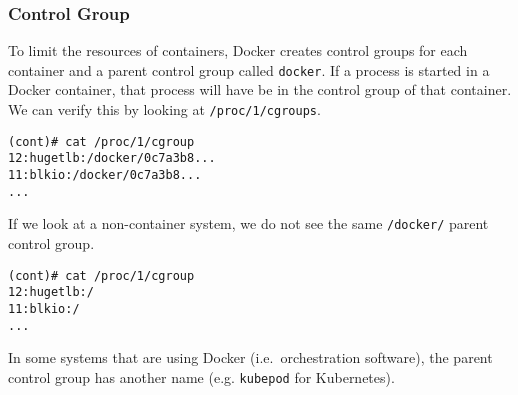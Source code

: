 \subsubsection{Control Group}
To limit the resources of containers, Docker creates control groups for each container and a parent control group called \lstinline{docker}. If a process is started in a Docker container, that process will have be in the control group of that container. We can verify this by looking at \lstinline{/proc/1/cgroups}\cite{Metasploit-Linux-Gather-Container-Detection}.

\begin{lstlisting}[caption={Process control group inside container\protect\footnotemark.},captionpos=b]
(cont)# cat /proc/1/cgroup
12:hugetlb:/docker/0c7a3b8...
11:blkio:/docker/0c7a3b8...
...
\end{lstlisting}

If we look at a non-container system, we do not see the same \lstinline{/docker/} parent control group.
\begin{lstlisting}[caption={Process control groups on host.},captionpos=b]
(cont)# cat /proc/1/cgroup
12:hugetlb:/
11:blkio:/
...
\end{lstlisting}

In some systems that are using Docker (i.e.\ orchestration software), the parent control group has another name (e.g. \lstinline{kubepod} for Kubernetes).

